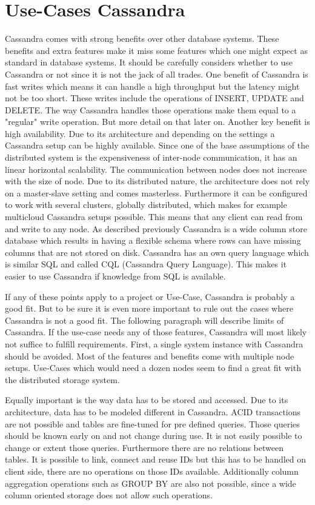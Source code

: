 \section{Use-Cases Cassandra}
Cassandra comes with strong benefits over other database systems. These benefits and extra features make it miss some features which one might expect as standard in database systems.
It should be carefully considers whether to use Cassandra or not since it is not the jack of all trades.
One benefit of Cassandra is fast writes which means it can handle a high throughput but the latency might not be too short. These writes include the operations of {INSERT}, {UPDATE} and {DELETE}. 
The way Cassandra handles those operations make them equal to a "regular" write operation. But more detail on that later on. Another key benefit is high availability. Due to its architecture and depending on the settings 
a Cassandra setup can be highly available. Since one of the base assumptions of the distributed system is the expensiveness of inter-node communication, it has an linear horizontal scalability. 
The communication between nodes does not increase with the size of node. Due to its distributed nature, the architecture does not rely on a master-slave setting and comes masterless. 
Furthermore it can be configured to work with several clusters, globally distributed, which makes for example multicloud Cassandra setups possible.
This means that any client can read from and write to any node. As described previously Cassandra is a wide column store database which results in having a flexible schema where rows can have missing columns that are not stored on disk.
Cassandra has an own query language which is similar SQL and called CQL (Cassandra Query Language). This makes it easier to use Cassandra if knowledge from SQL is available.

If any of these points apply to a project or Use-Case, Cassandra is probably a good fit.
But to be sure it is even more important to rule out the cases where Cassandra is not a good fit.
The following paragraph will describe limits of Cassandra. If the use-case needs any of those features, Cassandra will most likely not suffice to fulfill requirements.
First, a single system instance with Cassandra should be avoided. Most of the features and benefits come with multiple node setups. Use-Cases which would need a dozen nodes seem to find a great fit with the distributed storage system.

Equally important is the way data has to be stored and accessed. Due to its architecture, data has to be modeled different in Cassandra. ACID transactions are not possible and tables are fine-tuned for pre defined queries. Those queries should be known early on and not change during use. It is not easily possible to change or extent those queries. Furthermore there are no relations between tables. It is possible to link, connect and reuse IDs but this has to be handled on client side, there are no operations on those IDs available. Additionally column aggregation operations such as GROUP BY are also not possible, since a wide column oriented storage does not allow such operations.

